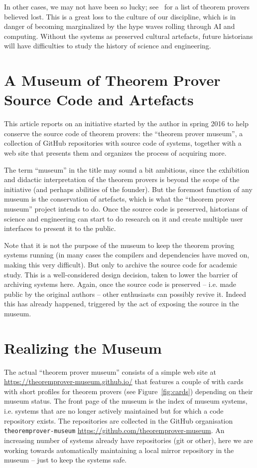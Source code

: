 \documentclass[smallcondensed]{svjour3}
\begin{document}
In other cases, we may not have been so lucky; see~\cite{tpmuseum:tpbl:on} for a list of
theorem provers believed lost. This is a great loss to the culture of our discipline,
which is in danger of becoming marginalized by the hype waves rolling through AI and
computing. Without the systems as preserved cultural artefacts, future historians will
have difficulties to study the history of science and engineering.

\section{A Museum of Theorem Prover Source Code and Artefacts}

This article reports on an initiative started by the author in spring 2016 to help
conserve the source code of theorem provers: the ``theorem prover museum'', a collection
of GitHub repositories with source code of systems, together with a web site that presents
them and organizes the process of acquiring more.

The term ``museum'' in the title may sound a bit ambitious, since the exhibition and
didactic interpretation of the theorem provers is beyond the scope of the initiative (and
perhaps abilities of the founder). But the foremost function of any museum is the
conservation of artefacts, which is what the ``theorem prover museum'' project intends to
do. Once the source code is preserved, historians of science and engineering can start to
do research on it and create multiple user interfaces to present it to the public.

Note that it is not the purpose of the museum to keep the theorem proving systems running
(in many cases the compilers and dependencies have moved on, making this very
difficult). But only to archive the source code for academic study.  This is a
well-considered design decision, taken to lower the barrier of archiving systems
here. Again, once the source code is preserved -- i.e. made public by the original authors
-- other enthusiasts can possibly revive it. Indeed this has already happened, triggered
by the act of exposing the source in the museum.

\section{Realizing the Museum}

The actual ``theorem prover museum'' consists of a simple web site at
\url{https://theoremprover-museum.github.io/} that features a couple of with cards with
short profiles for theorem provers (see Figure~\ref{fig:cards}) depending on their museum
status. The front page of the museum is the index of museum systems, i.e. systems that are
no longer actively maintained but for which a code repository exists. The repositories are
collected in the GitHub organisation \texttt{theoremprover-museum}
\url{https://github.com/theoremprover-museum}. An increasing number of systems already
have repositories (git or other), here we are working towards automatically maintaining a
local mirror repository in the museum -- just to keep the systems safe. 
\end{document}
